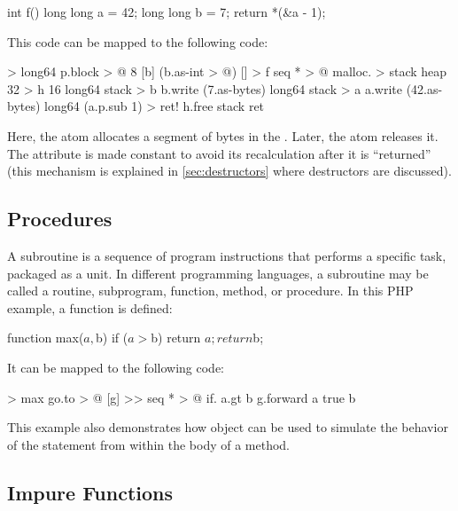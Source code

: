 \documentclass[sigplan,nonacm]{acmart}
\begin{document}
\begin{ffcode}
int f() {
  long long a = 42;
  long long b = 7;
  return *(&a - 1);
}
\end{ffcode}

This code can be mapped to the following \eolang{} code:

\begin{ffcode}
[p] > long64
  p.block > @
    8
    [b] (b.as-int > @)
[] > f
  seq * > @
    malloc. > stack
      heap 32 > h
      16
    long64 stack > b
    b.write (7.as-bytes)
    long64 stack > a
    a.write (42.as-bytes)
    long64 (a.p.sub 1) > ret!
    h.free stack
    ret
\end{ffcode}

Here, the atom  allocates a segment of bytes in the . Later, the atom  releases it.
The attribute  is made constant to avoid its recalculation after it is ``returned'' (this mechanism is explained in \cref{sec:destructors} where destructors are discussed).

\subsection{Procedures}
\label{sec:procedures}

A subroutine is a sequence of program instructions that performs a specific task, packaged as a unit.
In different programming languages, a subroutine may be called a routine, subprogram, function, method, or procedure.
In this PHP example, a function  is defined:

\begin{ffcode}
function max($a, $b) {
  if ($a > $b) return $a;
  return $b;
}
\end{ffcode}

It can be mapped to the following \eolang{} code:

\begin{ffcode}
[a b] > max
  go.to > @
    [g] >>
      seq * > @
        if.
          a.gt b
          g.forward a
          true
        b
\end{ffcode}

This example also demonstrates how  object can be used to simulate the behavior of the  statement from within the body of a method.

\subsection{Impure Functions}
\end{document}
